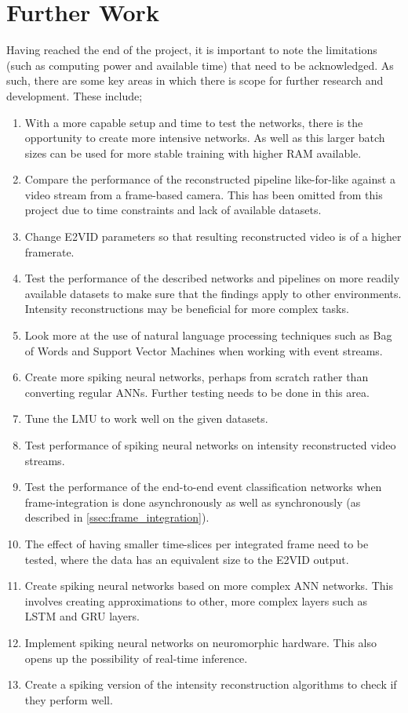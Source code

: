 \section{Further Work}

Having reached the end of the project, it is important to note the limitations (such as computing power and available time) that need to be acknowledged. As such, there are some key areas in which there is scope for further research and development. These include;

\begin{enumerate}
    \item With a more capable setup and time to test the networks, there is the opportunity to create more intensive networks. As well as this larger batch sizes can be used for more stable training with higher RAM available.
    \item Compare the performance of the reconstructed pipeline like-for-like against a video stream from a frame-based camera. This has been omitted from this project due to time constraints and lack of available datasets.
    \item Change E2VID parameters so that resulting reconstructed video is of a higher framerate.
    \item Test the performance of the described networks and pipelines on more readily available datasets to make sure that the findings apply to other environments. Intensity reconstructions may be beneficial for more complex tasks.
    \item Look more at the use of natural language processing techniques such as Bag of Words and Support Vector Machines when working with event streams.
    \item Create more spiking neural networks, perhaps from scratch rather than converting regular ANNs. Further testing needs to be done in this area.
    \item Tune the LMU to work well on the given datasets.
    \item Test performance of spiking neural networks on intensity reconstructed video streams.
    \item Test the performance of the end-to-end event classification networks when frame-integration is done asynchronously as well as synchronously (as described in \cref{ssec:frame_integration}). 
    \item The effect of having smaller time-slices per integrated frame need to be tested, where the data has an equivalent size to the E2VID output.
    \item Create spiking neural networks based on more complex ANN networks. This involves creating approximations to other, more complex layers such as LSTM and GRU layers.
    \item Implement spiking neural networks on neuromorphic hardware. This also opens up the possibility of real-time inference.
    \item Create a spiking version of the intensity reconstruction algorithms to check if they perform well.
\end{enumerate}

